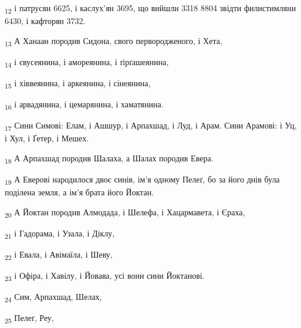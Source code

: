 \begin{tcolorbox}
\textsubscript{12} і патрусян 6625, і каслух'ян 3695, що вийшли 3318 8804 звідти филистимляни 6430, і кафторян 3732.
\end{tcolorbox}
\begin{tcolorbox}
\textsubscript{13} А Ханаан породив Сидона, свого первородженого, і Хета,
\end{tcolorbox}
\begin{tcolorbox}
\textsubscript{14} і євусеянина, і амореянина, і ґірґашеянина,
\end{tcolorbox}
\begin{tcolorbox}
\textsubscript{15} і хіввеянина, і аркеянина, і сінеянина,
\end{tcolorbox}
\begin{tcolorbox}
\textsubscript{16} і арвадянина, і цемарянина, і хаматянина.
\end{tcolorbox}
\begin{tcolorbox}
\textsubscript{17} Сини Симові: Елам, і Ашшур, і Арпахшад, і Луд, і Арам. Сини Арамові: і Уц, і Хул, і Ґетер, і Мешех.
\end{tcolorbox}
\begin{tcolorbox}
\textsubscript{18} А Арпахшад породив Шалаха, а Шалах породив Евера.
\end{tcolorbox}
\begin{tcolorbox}
\textsubscript{19} А Еверові народилося двоє синів, ім'я одному Пелеґ, бо за його днів була поділена земля, а ім'я брата його Йоктан.
\end{tcolorbox}
\begin{tcolorbox}
\textsubscript{20} А Йоктан породив Алмодада, і Шелефа, і Хацармавета, і Єраха,
\end{tcolorbox}
\begin{tcolorbox}
\textsubscript{21} і Гадорама, і Узала, і Діклу,
\end{tcolorbox}
\begin{tcolorbox}
\textsubscript{22} і Евала, і Авімаїла, і Шеву,
\end{tcolorbox}
\begin{tcolorbox}
\textsubscript{23} і Офіра, і Хавілу, і Йовава, усі вони сини Йоктанові.
\end{tcolorbox}
\begin{tcolorbox}
\textsubscript{24} Сим, Арпахшад, Шелах,
\end{tcolorbox}
\begin{tcolorbox}
\textsubscript{25} Пелеґ, Реу,
\end{tcolorbox}

